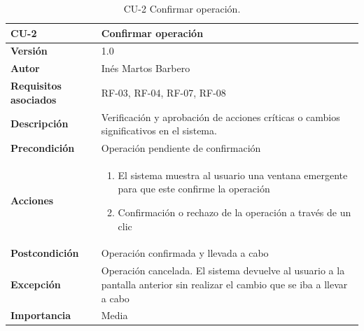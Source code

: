 \begin{table}[p]
	\centering
	\begin{tabularx}{\linewidth}{ p{} p{} }
		\toprule
		\textbf{CU-2}    & \textbf{Confirmar operación}\\
		\toprule
        \textbf{Versión}              & 1.0    \\
		\textbf{Autor}                & Inés Martos Barbero \\
		\textbf{Requisitos asociados} & RF-03, RF-04, RF-07, RF-08 \\
		\textbf{Descripción}          & Verificación y aprobación de acciones críticas o cambios significativos en el sistema. \\
		\textbf{Precondición}         & Operación pendiente de confirmación \\
		\textbf{Acciones}             &
		\begin{enumerate}
			\def\labelenumi{\arabic{enumi}.}
			\tightlist
			\item El sistema muestra al usuario una ventana emergente para que este confirme la operación
			\item Confirmación o rechazo de la operación a través de un clic
		\end{enumerate}\\
		\textbf{Postcondición}        & Operación confirmada y llevada a cabo \\
        \textbf{Excepción}            & Operación cancelada. El sistema devuelve al usuario a la pantalla anterior sin realizar el cambio que se iba a llevar a cabo \\
		\textbf{Importancia}          & Media \\
		\bottomrule
	\end{tabularx}
	\caption{CU-2 Confirmar operación.}
\end{table}

